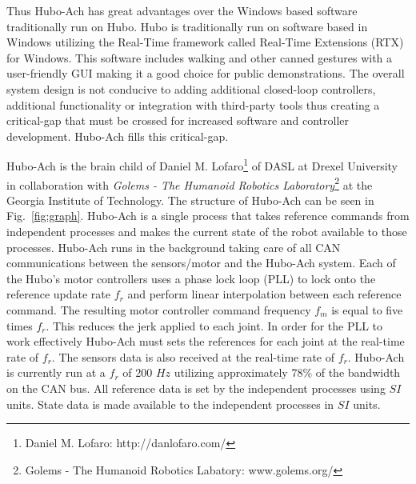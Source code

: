 Thus Hubo-Ach has great advantages over the Windows based software traditionally run on Hubo.
Hubo is traditionally run on software based in Windows utilizing the Real-Time framework called Real-Time Extensions (RTX) for Windows.
This software includes walking and other canned gestures with a user-friendly GUI making it a good choice for public demonstrations.
The overall system design is not conducive to adding additional closed-loop controllers, additional functionality or integration with third-party tools thus creating a critical-gap that must be crossed for increased software and controller development.
Hubo-Ach fills this critical-gap.


Hubo-Ach is the brain child of Daniel M. Lofaro\footnote{Daniel M. Lofaro: http://danlofaro.com/} of DASL at Drexel University in collaboration with \textit{Golems - The Humanoid Robotics Laboratory}\footnote{Golems - The Humanoid Robotics Labatory: www.golems.org/} at the Georgia Institute of Technology.  
The structure of Hubo-Ach can be seen in Fig.~\ref{fig:graph}.
Hubo-Ach is a single process that takes reference commands from independent processes and makes the current state of the robot available to those processes.
Hubo-Ach runs in the background taking care of all CAN communications between the sensors/motor and the Hubo-Ach system.
Each of the Hubo's motor controllers uses a phase lock loop (PLL) to lock onto the reference update rate $f_r$ and perform linear interpolation between each reference command.  
The resulting motor controller command frequency $f_m$ is equal to five times $f_r$.
This reduces the jerk applied to each joint.
In order for the PLL to work effectively Hubo-Ach must sets the references for each joint at the real-time rate of $f_r$.
The sensors data is also received at the real-time rate of $f_r$.
Hubo-Ach is currently run at a $f_r$ of 200 $Hz$ utilizing approximately 78\% of the bandwidth on the CAN bus.
All reference data is set by the independent processes using $SI$ units.
State data is made available to the independent processes in $SI$ units.


